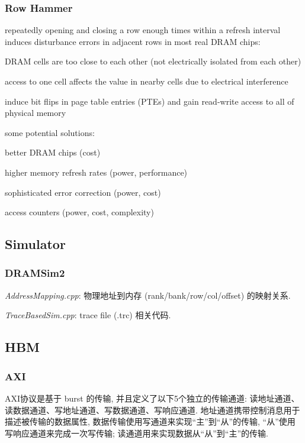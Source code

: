 \documentclass[UTF8,12pt,a4paper]{article}
\begin{document}
\subsubsection{Row Hammer}
repeatedly opening and closing a row enough times within a refresh interval
induces disturbance errors in adjacent rows in most real DRAM chips:
\begin{compactitem}
  \item DRAM cells are too close to each other (not electrically isolated from each other)
  \item access to one cell affects the value in nearby cells due to electrical interference
  \item induce bit flips in page table entries (PTEs) and gain read-write access to all of physical memory
\end{compactitem}

some potential solutions:
\begin{compactitem}
  \item better DRAM chips (cost)
  \item higher memory refresh rates (power, performance)
  \item sophisticated error correction (power, cost)
  \item access counters (power, cost, complexity)
\end{compactitem}

\subsection{Simulator}
\subsubsection{DRAMSim2}
\begin{compactitem}
  \item \textit{AddressMapping.cpp}: 物理地址到内存 (rank/bank/row/col/offset) 的映射关系.
  \item \textit{TraceBasedSim.cpp}: trace file (.trc) 相关代码.
\end{compactitem}

\subsection{HBM}
\label{sub:HBM}
\subsubsection{AXI}
AXI协议是基于 burst 的传输,
并且定义了以下5个独立的传输通道:
读地址通道、读数据通道、写地址通道、写数据通道、写响应通道.
地址通道携带控制消息用于描述被传输的数据属性,
数据传输使用写通道来实现``主''到``从''的传输,
``从''使用写响应通道来完成一次写传输;
读通道用来实现数据从``从''到``主''的传输.
\end{document}
